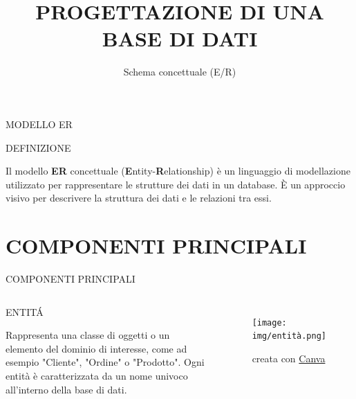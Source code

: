 \documentclass[aspectratio=1610]{beamer}
\title{PROGETTAZIONE DI UNA BASE DI DATI}
\subtitle{Schema concettuale (E/R)}
\date{}
\institute{\textit{
        Fonti:
        \begin{itemize}
            \item[-] \href{https://catalogo.sanoma.it/si-op-104157-dal-bit-all-intelligenza-artificiale.html\#bundles.tab}{Dal Bit all'Intelligenza Artificiale}
            \item[-] \href{https://it.wikipedia.org/wiki/Modello_E-R}{Wikipedia}
        \end{itemize}
    }
}
\begin{document}
\begin{frame}
    \titlepage
\end{frame}

\begin{frame}{MODELLO ER}
    \begin{alertblock}{DEFINIZIONE}
        \begin{minipage}{0.98\linewidth}
            \justifying
            Il modello \textbf{ER} concettuale (\textbf{E}ntity-\textbf{R}elationship) è un linguaggio 
            di modellazione utilizzato per rappresentare le strutture dei dati 
            in un database. È un approccio visivo per descrivere la struttura 
            dei dati e le relazioni tra essi.\\
            \bigskip
        \end{minipage}
    \end{alertblock}
\end{frame}

\section{COMPONENTI PRINCIPALI}

\begin{frame}{COMPONENTI PRINCIPALI}
    \begin{columns}
            \begin{alertblock}{ENTIT\'A}
                \begin{minipage}{0.96\linewidth}
                    \justifying
                    Rappresenta una classe di oggetti o un elemento del dominio di 
                    interesse, come ad esempio "Cliente", "Ordine" o "Prodotto". 
                    Ogni entità è caratterizzata da un nome univoco all’interno della base di dati.\\
                    \bigskip
                \end{minipage}
            \end{alertblock}
            \begin{figure}
                \texttt{[image: img/entità.png]}
                \caption{{creata con \href{www.canva.com}{Canva}}}
            \end{figure}
    \end{columns}
\end{frame}
\end{document}

